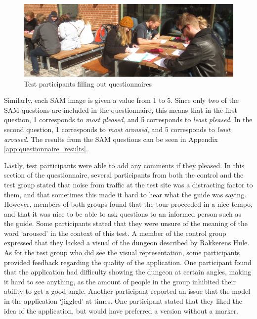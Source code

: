 \begin{figure}[h!]
   \centering
   \includegraphics[width=\textwidth]{figures/participants_questionnaire.jpg}
   \caption{Test participants filling out questionnaires}\label{fig:participants_questionnaire}
\end{figure}

 
Similarly, each SAM image is given a value from 1 to 5. Since only two of the SAM questions are included in the questionnaire, this means that in the first question, 1 corresponds to \textit{most pleased}, and 5 corresponds to \textit{least pleased}. In the second question, 1 corresponds to \textit{most aroused}, and 5 corresponds to \textit{least aroused}. The results from the SAM questions can be seen in Appendix \ref{app:questionnaire_results}.
 
Lastly, test participants were able to add any comments if they pleased. In this section of the questionnaire, several participants from both the control and the test group stated that noise from traffic at the test site was a distracting factor to them, and that sometimes this made it hard to hear what the guide was saying. However, members of both groups found that the tour proceeded in a nice tempo, and that it was nice to be able to ask questions to an informed person such as the guide. Some participants stated that they were unsure of the meaning of the word ‘aroused’ in the context of this test. A member of the control group expressed that they lacked a visual of the dungeon described by Rakkerens Hule. As for the test group who did see the visual representation, some participants provided feedback regarding the quality of the application. One participant found that the application had difficulty showing the dungeon at certain angles, making it hard to see anything, as the amount of people in the group inhibited their ability to get a good angle. Another participant reported an issue that the model in the application ‘jiggled’ at times. One participant stated that they liked the idea of the application, but would have preferred a version without a marker.
 
